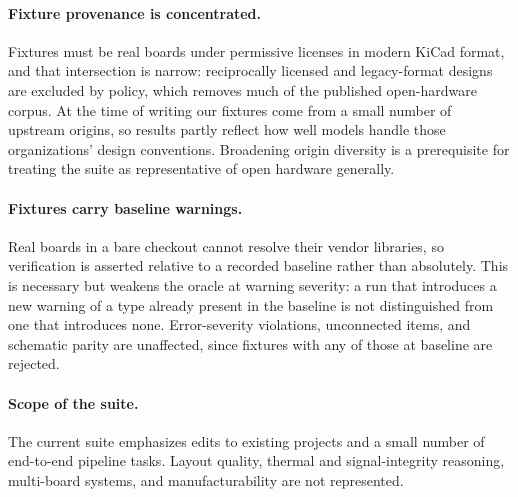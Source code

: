 \paragraph{Fixture provenance is concentrated.} Fixtures must be real boards under permissive licenses in modern KiCad format, and that intersection is narrow: reciprocally licensed and legacy-format designs are excluded by policy, which removes much of the published open-hardware corpus. At the time of writing our fixtures come from a small number of upstream origins, so results partly reflect how well models handle those organizations' design conventions. Broadening origin diversity is a prerequisite for treating the suite as representative of open hardware generally.

\paragraph{Fixtures carry baseline warnings.} Real boards in a bare checkout cannot resolve their vendor libraries, so verification is asserted relative to a recorded baseline rather than absolutely. This is necessary but weakens the oracle at warning severity: a run that introduces a new warning of a type already present in the baseline is not distinguished from one that introduces none. Error-severity violations, unconnected items, and schematic parity are unaffected, since fixtures with any of those at baseline are rejected.

\paragraph{Scope of the suite.} The current suite emphasizes edits to existing projects and a small number of end-to-end pipeline tasks. Layout quality, thermal and signal-integrity reasoning, multi-board systems, and manufacturability are not represented.
